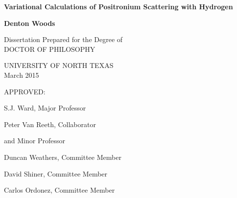 
\begin{titlepage}
    \begin{center}
        \vspace*{1cm}
        
        \LARGE
        \textbf{Variational Calculations of Positronium Scattering with Hydrogen}
        \vspace{0.5cm}
		
        \Large     
        \textbf{Denton Woods}
        
        \vspace{4cm}
        
		\normalsize
        Dissertation Prepared for the Degree of\\
        DOCTOR OF PHILOSOPHY
        
		\vspace{4cm}
		
        \normalsize
		UNIVERSITY OF NORTH TEXAS\\
		March 2015
    \end{center}

	\vfill
  
	\hspace{8cm} APPROVED:
	\vspace{0.1cm}
	
	\hspace{8cm} S.J. Ward, Major Professor

	\hspace{8cm} Peter Van Reeth, Collaborator

	\hspace{9cm} 	and Minor Professor

	\hspace{8cm} Duncan Weathers, Committee Member

	\hspace{8cm} David Shiner, Committee Member

	\hspace{8cm} Carlos Ordonez, Committee Member

\end{titlepage}
